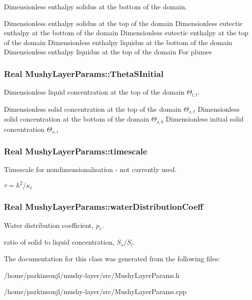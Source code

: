 Dimensionless enthalpy solidus at the bottom of the domain. 

Dimensionless enthalpy solidus at the top of the domain Dimensionless eutectic enthalpy at the bottom of the domain Dimensionless eutectic enthalpy at the top of the domain Dimensionless enthalpy liquidus at the bottom of the domain Dimensionless enthalpy liquidus at the top of the domain For plumes \hypertarget{class_mushy_layer_params_a71937d2796fc2c061fc8b4781355fd00}{
\subsubsection[{Theta\-S\-Initial}]{\setlength{\rightskip}{0pt plus 5cm}Real Mushy\-Layer\-Params\-::\-Theta\-S\-Initial}}\label{class_mushy_layer_params_a71937d2796fc2c061fc8b4781355fd00}


Dimensionless liquid concentration at the top of the domain $ \Theta_{l,t} $. 

Dimensionless solid concentration at the top of the domain $ \Theta_{s,t} $ Dimensionless solid concentration at the bottom of the domain $ \Theta_{s,b} $ Dimensionless initial solid concentration $ \Theta_{s,i} $ \hypertarget{class_mushy_layer_params_a77c66c8908da36411b789c07dd412eca}{
\subsubsection[{timescale}]{\setlength{\rightskip}{0pt plus 5cm}Real Mushy\-Layer\-Params\-::timescale}}\label{class_mushy_layer_params_a77c66c8908da36411b789c07dd412eca}


Timescale for nondimensionalisation -\/ not currently used. 

$ \tau = h^2 / \kappa_l $ \hypertarget{class_mushy_layer_params_a2b0038ec10c9660952ea88efd146a846}{
\subsubsection[{water\-Distribution\-Coeff}]{\setlength{\rightskip}{0pt plus 5cm}Real Mushy\-Layer\-Params\-::water\-Distribution\-Coeff}}\label{class_mushy_layer_params_a2b0038ec10c9660952ea88efd146a846}


Water distribution coefficient, $ p_c $. 

ratio of solid to liquid concentration, $ S_s/S_l $. 

The documentation for this class was generated from the following files\-:\begin{DoxyCompactItemize}
\item 
/home/parkinsonjl/mushy-\/layer/src/Mushy\-Layer\-Params.\-h\item 
/home/parkinsonjl/mushy-\/layer/src/Mushy\-Layer\-Params.\-cpp\end{DoxyCompactItemize}

